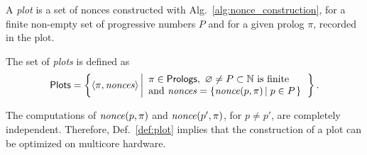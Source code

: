 %
A \emph{plot} is a set of nonces constructed with Alg.~\ref{alg:nonce_construction},
for a finite non-empty set of progressive numbers $P$ and
for a given prolog $\pi$, recorded in the plot.
%
\begin{definition}[Plot]\label{def:plot}
  The set of \emph{plots} is defined as
  \[
  {\mathsf{Plots}}=\left\{\left<\pi,{\mathit{nonces}}\right>\left|\begin{array}{l}
  \pi\in{\mathsf{Prologs}},\ \varnothing\not=P\subset\mathbb{N}\text{ is finite}\\
  \text{and }{\mathit{nonces}}=\left\{{\mathit{nonce}}(p,\pi)\left|\;p\in P\right.\right\}
  \end{array}\right.\right\}.
  \]
\end{definition}
%
The computations of ${\mathit{nonce}}(p,\pi)$ and ${\mathit{nonce}}(p',\pi)$, for $p\not=p'$,
are completely independent. Therefore, Def.~\ref{def:plot}
implies that the construction of a plot can be optimized on
multicore hardware.
